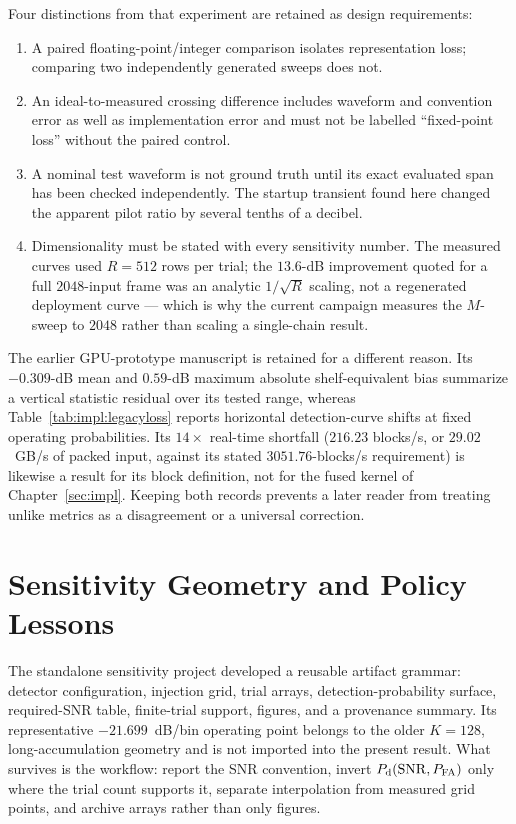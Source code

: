 Four distinctions from that experiment are retained as design requirements:

\begin{enumerate}
  \item A paired floating-point/integer comparison isolates representation loss;
  comparing two independently generated sweeps does not.
  \item An ideal-to-measured crossing difference includes waveform and convention
  error as well as implementation error and must not be labelled ``fixed-point
  loss'' without the paired control.
  \item A nominal test waveform is not ground truth until its exact evaluated span
  has been checked independently.  The startup transient found here changed the
  apparent pilot ratio by several tenths of a decibel.
  \item Dimensionality must be stated with every sensitivity number.  The measured
  curves used $R=512$ rows per trial; the $13.6$-dB improvement quoted for a full
  $2048$-input frame was an analytic $1/\sqrt{R}$ scaling, not a regenerated
  deployment curve --- which is why the current campaign measures the $M$-sweep
  to $2048$ rather than scaling a single-chain result.
\end{enumerate}

The earlier GPU-prototype manuscript is retained for a different reason.  Its
$-0.309$-dB mean and $0.59$-dB maximum absolute shelf-equivalent bias summarize a
vertical statistic residual over its tested range, whereas
Table~\ref{tab:impl:legacyloss} reports horizontal detection-curve shifts at fixed
operating probabilities.  Its $14\times$ real-time shortfall ($216.23$ blocks/s, or $29.02$~GB/s of
packed input, against its stated $3051.76$-blocks/s requirement) is likewise a
result for its block definition, not for the fused kernel of
Chapter~\ref{sec:impl}.
Keeping both records prevents a later reader from treating unlike metrics as a
disagreement or a universal correction.

\section{Sensitivity Geometry and Policy Lessons}

The standalone sensitivity project developed a reusable artifact grammar:
detector configuration, injection grid, trial arrays, detection-probability
surface, required-SNR table, finite-trial support, figures, and a provenance
summary.  Its representative $-21.699$~dB/bin operating point belongs to the
older $K=128$, long-accumulation geometry and is not imported into the present
result.  What survives is the workflow: report the SNR convention, invert
$P_{\rm d}(\mathrm{SNR},P_{\rm FA})$ only where the trial count supports it,
separate interpolation from measured grid points, and archive arrays rather than
only figures.

